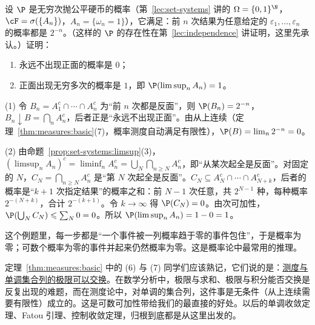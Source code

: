 \begin{workedexample}\label{we:measures:coin-continuity}
设 $\P$ 是无穷次抛公平硬币的概率（第~\ref{lec:set-systems} 讲的 $\Omega=\{0,1\}^\N$，$\cF=\sigma(\{A_n\})$，$A_n=\{\omega_n=1\}$），它满足：前 $n$ 次结果为任意给定的 $\varepsilon_1,\dots,\varepsilon_n$ 的概率都是 $2^{-n}$。（这样的 $\P$ 的存在性在第~\ref{lec:independence} 讲证明，这里先承认。）证明：
\begin{enumerate}
\item 永远不出现正面的概率是 $0$；
\item 正面出现无穷多次的概率是 $1$，即 $\P(\limsup_nA_n)=1$。
\end{enumerate}
\end{workedexample}
\begin{solution}
(1) 令 $B_n=A_1^c\cap\cdots\cap A_n^c$ 为“前 $n$ 次都是反面”，则 $\P(B_n)=2^{-n}$，$B_n\downarrow B=\bigcap_nA_n^c$，后者正是“永远不出现正面”。由从上连续（定理~\ref{thm:measures:basic}(7)，概率测度自动满足有限性），$\P(B)=\lim_n2^{-n}=0$。

(2) 由命题~\ref{prop:set-systems:limsup}(3)，$(\limsup_nA_n)^c=\liminf_nA_n^c=\bigcup_N\bigcap_{n\geqslant N}A_n^c$，即“从某次起全是反面”。对固定的 $N$，$C_N=\bigcap_{n\geqslant N}A_n^c$ 是“第 $N$ 次起全是反面”。$C_N\subseteq A_N^c\cap\cdots\cap A_{N+k}^c$，后者的概率是“$k+1$ 次指定结果”的概率之和：前 $N-1$ 次任意，共 $2^{N-1}$ 种，每种概率 $2^{-(N+k)}$，合计 $2^{-(k+1)}$。令 $k\to\infty$ 得 $\P(C_N)=0$。由次可加性，$\P(\bigcup_NC_N)\leqslant\sum_N0=0$。所以 $\P(\limsup_nA_n)=1-0=1$。

这个例题里，每一步都是“一个事件被一列概率趋于零的事件包住”，于是概率为零；可数个概率为零的事件并起来仍然概率为零。这是概率论中最常用的推理。
\end{solution}

\begin{remark}
定理~\ref{thm:measures:basic} 中的 (6) 与 (7) 同学们应该熟记，它们说的是：\uline{测度与单调集合列的极限可以交换}。在数学分析中，极限与求和、极限与积分能否交换是反复出现的难题，而在测度论中，对单调的集合列，这件事是无条件（从上连续需要有限性）成立的。这是可数可加性带给我们的最直接的好处。以后的单调收敛定理、Fatou 引理、控制收敛定理，归根到底都是从这里出发的。
\end{remark}

